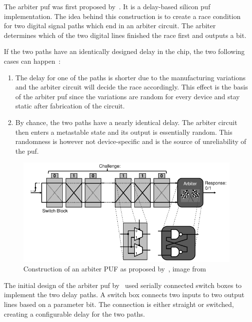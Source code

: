 The arbiter \gls{puf} was first proposed by~\cite{Lee2004}. It is a delay-based silicon \gls{puf} implementation. The idea behind this construction is to create a race condition for two digital signal paths which end in an arbiter circuit. The arbiter determines which of the two digital lines finished the race first and outputs a bit.

If the two paths have an identically designed delay in the chip, the two following cases can happen~\cite{Maes2013}:

\begin{enumerate}
    \item The delay for one of the paths is shorter due to the manufacturing variations and the arbiter circuit will decide the race accordingly. This effect is the basis of the arbiter \gls{puf} since the variations are random for every device and stay static after fabrication of the circuit.
    \item By chance, the two paths have a nearly identical delay. The arbiter circuit then enters a metastable state and its output is essentially random. This randomness is however not device-specific and is the source of unreliability of the \gls{puf}.
\end{enumerate}

\begin{figure}[h!]
    \centering
    \captionsetup{justification=centering,margin=0.5cm}
    \includegraphics[width=\textwidth]{images/arbiter_puf.pdf}
    \caption[Construction of an arbiter PUF]{Construction of an arbiter PUF as proposed by~\cite{Lee2004}, image from~\cite{Maes2012}}
    \label{fig:arbiter_puf}
\end{figure}

The initial design of the arbiter \gls{puf} by~\cite{Lee2004} used serially connected switch boxes to implement the two delay paths. A switch box connects two inputs to two output lines based on a parameter bit. The connection is either straight or switched, creating a configurable delay for the two paths.

